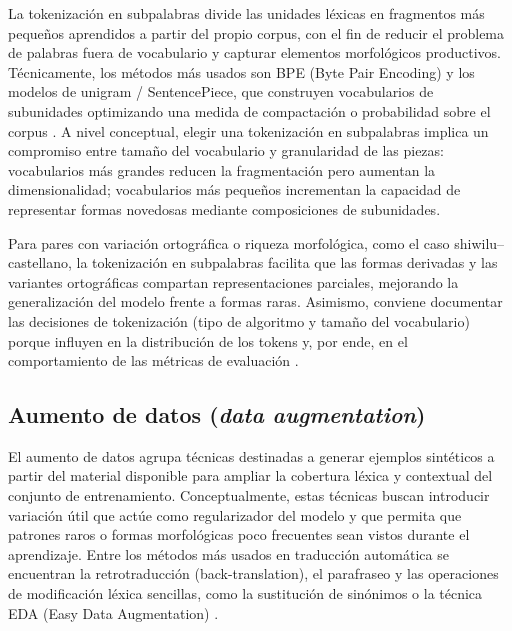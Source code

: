 \documentclass[12pt,a4paper,oneside]{book}
\begin{document}
La tokenización en subpalabras divide las unidades léxicas en fragmentos más pequeños aprendidos a partir del propio corpus, con el fin de reducir el problema de palabras fuera de vocabulario y capturar elementos morfológicos productivos. Técnicamente, los métodos más usados son BPE (Byte Pair Encoding) y los modelos de unigram / SentencePiece, que construyen vocabularios de subunidades optimizando una medida de compactación o probabilidad sobre el corpus \parencite{sennrich2016bt,kudo2018sentencepiece}. A nivel conceptual, elegir una tokenización en subpalabras implica un compromiso entre tamaño del vocabulario y granularidad de las piezas: vocabularios más grandes reducen la fragmentación pero aumentan la dimensionalidad; vocabularios más pequeños incrementan la capacidad de representar formas novedosas mediante composiciones de subunidades.

Para pares con variación ortográfica o riqueza morfológica, como el caso shiwilu--castellano, la tokenización en subpalabras facilita que las formas derivadas y las variantes ortográficas compartan representaciones parciales, mejorando la generalización del modelo frente a formas raras. Asimismo, conviene documentar las decisiones de tokenización (tipo de algoritmo y tamaño del vocabulario) porque influyen en la distribución de los tokens y, por ende, en el comportamiento de las métricas de evaluación \parencite{sennrich2016bt,kudo2018sentencepiece}.

\subsection{\texorpdfstring{Aumento de datos (\emph{data augmentation})}{Aumento de datos (data augmentation)}}\label{aumento-de-datos-data-augmentation}

El aumento de datos agrupa técnicas destinadas a generar ejemplos sintéticos a partir del material disponible para ampliar la cobertura léxica y contextual del conjunto de entrenamiento. Conceptualmente, estas técnicas buscan introducir variación útil que actúe como regularizador del modelo y que permita que patrones raros o formas morfológicas poco frecuentes sean vistos durante el aprendizaje. Entre los métodos más usados en traducción automática se encuentran la retrotraducción (back-translation), el parafraseo y las operaciones de modificación léxica sencillas, como la sustitución de sinónimos o la técnica EDA (Easy Data Augmentation) \parencite{sennrich2016bt,wei2019eda}.
\end{document}
